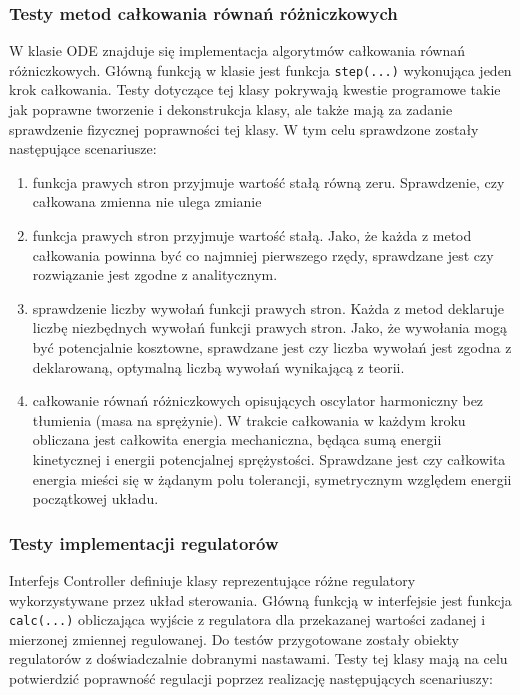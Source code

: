 \subsubsection{Testy metod całkowania równań różniczkowych}

W klasie ODE znajduje się implementacja algorytmów całkowania równań różniczkowych. Główną funkcją w klasie jest funkcja \texttt{step(...)} wykonująca jeden krok całkowania. Testy dotyczące tej klasy pokrywają kwestie programowe takie jak poprawne tworzenie i dekonstrukcja klasy, ale także mają za zadanie sprawdzenie fizycznej poprawności tej klasy. W tym celu sprawdzone zostały następujące scenariusze:

\begin{enumerate}
\item funkcja prawych stron przyjmuje wartość stałą równą zeru. Sprawdzenie, czy całkowana zmienna nie ulega zmianie
\item funkcja prawych stron przyjmuje wartość stałą. Jako, że każda z metod całkowania powinna być co najmniej pierwszego rzędy, sprawdzane jest czy rozwiązanie jest zgodne z analitycznym.
\item sprawdzenie liczby wywołań funkcji prawych stron. Każda z metod deklaruje liczbę niezbędnych wywołań funkcji prawych stron. Jako, że wywołania mogą być potencjalnie kosztowne, sprawdzane jest czy liczba wywołań jest zgodna z deklarowaną, optymalną liczbą wywołań wynikającą z teorii.
\item całkowanie równań różniczkowych opisujących oscylator harmoniczny bez tłumienia (masa na sprężynie). W trakcie całkowania w każdym kroku obliczana jest całkowita energia mechaniczna, będąca sumą energii kinetycznej i energii potencjalnej sprężystości. Sprawdzane jest czy całkowita energia mieści się w żądanym polu tolerancji, symetrycznym względem energii początkowej układu.
\end{enumerate}
 
\subsubsection{Testy implementacji regulatorów}

Interfejs Controller definiuje klasy reprezentujące różne regulatory wykorzystywane przez układ sterowania. Główną funkcją w interfejsie jest funkcja \texttt{calc(...)} obliczająca wyjście z regulatora dla przekazanej wartości zadanej i mierzonej zmiennej regulowanej. Do testów przygotowane zostały obiekty regulatorów z doświadczalnie dobranymi nastawami. Testy tej klasy mają na celu potwierdzić poprawność regulacji poprzez realizację następujących scenariuszy:

